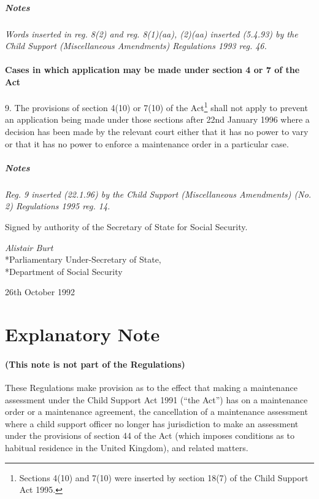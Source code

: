 \documentclass[a4paper]{article}
\newcommand{\parthead}{}
\newcommand\amendment[1]{\subsubsection*{Notes}{\itshape\frenchspacing\footnotesize #1 \par}}
\begin{document}
\amendment{
Words inserted in reg. 8(2) and reg. 8(1)(aa), (2)(aa) inserted (5.4.93) by the Child Support (Miscellaneous Amendments) Regulations 1993 reg. 46.
}

\subsection[9. Cases in which application may be made under section 4 or 7 of the Act]{Cases in which application may be made under section 4 or 7 of the Act}

9.  The provisions of section 4(10) or 7(10) of the Act\footnote{\frenchspacing Sections 4(10) and 7(10) were inserted by section 18(7) of the Child Support Act 1995.} shall not apply to prevent an application being made under those sections after 22nd January 1996 where a decision has been made by the relevant court either that it has no power to vary or that it has no power to enforce a maintenance order in a particular case.

\amendment{
Reg. 9 inserted (22.1.96) by the Child Support (Miscellaneous Amendments) (No. 2) Regulations 1995 reg. 14.
}

\bigskip

Signed by authority of the Secretary of State for Social Security.

{\raggedleft
\emph{Alistair Burt}\\*Parliamentary Under-Secretary of State,\\*Department of Social Security

}

26th October 1992

\part{Explanatory Note}

\renewcommand\parthead{--- Explanatory Note}

\subsection*{(This note is not part of the Regulations)}

 These Regulations make provision as to the effect that making a maintenance assessment under the Child Support Act 1991 (“the Act”) has on a maintenance order or a maintenance agreement, the cancellation of a maintenance assessment where a child support officer no longer has jurisdiction to make an assessment under the provisions of section 44 of the Act (which imposes conditions as to habitual residence in the United Kingdom), and related matters.
\end{document}
